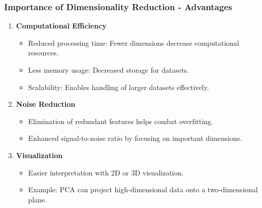 \documentclass[aspectratio=169]{beamer}
\begin{document}
\begin{frame}[fragile]
    \frametitle{Importance of Dimensionality Reduction - Advantages}
    \begin{enumerate}
        \item \textbf{Computational Efficiency}
        \begin{itemize}
            \item Reduced processing time: Fewer dimensions decrease computational resources.
            \item Less memory usage: Decreased storage for datasets.
            \item Scalability: Enables handling of larger datasets effectively.
        \end{itemize}
        
        \item \textbf{Noise Reduction}
        \begin{itemize}
            \item Elimination of redundant features helps combat overfitting.
            \item Enhanced signal-to-noise ratio by focusing on important dimensions.
        \end{itemize}
        
        \item \textbf{Visualization}
        \begin{itemize}
            \item Easier interpretation with 2D or 3D visualization.
            \item Example: PCA can project high-dimensional data onto a two-dimensional plane.
        \end{itemize}
    \end{enumerate}
\end{frame}
\end{document}
